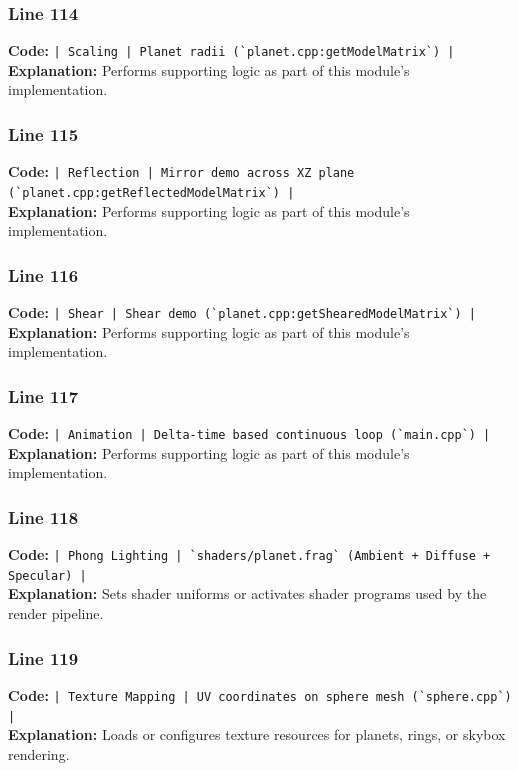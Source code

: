 \documentclass[11pt,a4paper]{article}
\begin{document}
\subsubsection*{Line 114}
\textbf{Code:} \verb!| Scaling | Planet radii (`planet.cpp:getModelMatrix`) |!\\
\textbf{Explanation:} Performs supporting logic as part of this module's implementation.

\subsubsection*{Line 115}
\textbf{Code:} \verb!| Reflection | Mirror demo across XZ plane (`planet.cpp:getReflectedModelMatrix`) |!\\
\textbf{Explanation:} Performs supporting logic as part of this module's implementation.

\subsubsection*{Line 116}
\textbf{Code:} \verb!| Shear | Shear demo (`planet.cpp:getShearedModelMatrix`) |!\\
\textbf{Explanation:} Performs supporting logic as part of this module's implementation.

\subsubsection*{Line 117}
\textbf{Code:} \verb!| Animation | Delta-time based continuous loop (`main.cpp`) |!\\
\textbf{Explanation:} Performs supporting logic as part of this module's implementation.

\subsubsection*{Line 118}
\textbf{Code:} \verb!| Phong Lighting | `shaders/planet.frag` (Ambient + Diffuse + Specular) |!\\
\textbf{Explanation:} Sets shader uniforms or activates shader programs used by the render pipeline.

\subsubsection*{Line 119}
\textbf{Code:} \verb!| Texture Mapping | UV coordinates on sphere mesh (`sphere.cpp`) |!\\
\textbf{Explanation:} Loads or configures texture resources for planets, rings, or skybox rendering.
\end{document}
